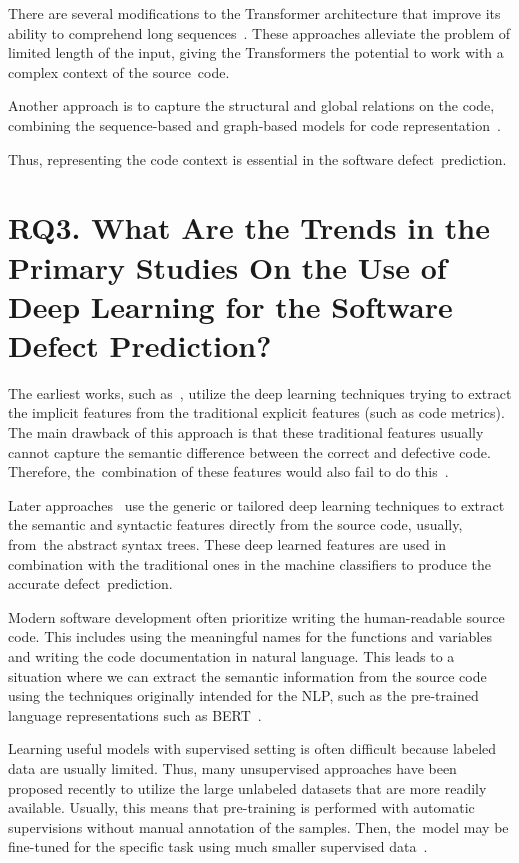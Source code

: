 \documentclass[mathematics,review,accept,moreauthors,pdftex]{Definitions/mdpi}
\begin{document}
\begin{paracol}{2}
There are several modifications to the Transformer architecture that improve its ability to comprehend long sequences~\cite{zaheer2021big,fiok2021text,beltagy2020longformer}. These approaches alleviate the problem of limited length of the input, giving the Transformers the potential to work with a complex context of the source~code. 
 
 Another approach is to capture the structural and global relations on the code, combining the sequence-based and graph-based models for code representation~\cite{hellendoorn2020global,guo2021graphcodebert}. 

Thus, representing the code context is essential in the software defect~prediction. 

\section{RQ3. What Are the Trends in the Primary Studies On the Use of Deep Learning for the Software Defect Prediction?} \label{sec_5}

The earliest works, such as~\cite{YangEtAl2015}, utilize the deep learning techniques trying to extract the implicit features from the traditional explicit features (such as code metrics).
The main drawback of this approach is that these traditional features usually cannot capture the semantic difference between the correct and defective code. Therefore, the~combination of these features would also fail to do this~\cite{LiEtAl2017}.

Later approaches~\cite{DamEtAl2019,HoangEtAl2019} use the generic or tailored deep learning techniques to extract the semantic and syntactic features directly from the source code, usually, from~the abstract syntax trees. These deep learned features are used in combination with the traditional ones in the machine classifiers to produce the accurate defect~prediction.

Modern software development often prioritize writing the human-readable source code. This includes using the  meaningful names for the functions and variables and writing the code documentation in natural language. This leads to a situation where we can extract the semantic information from the source code using the techniques originally intended for the NLP, such as the pre-trained language representations such as BERT~\cite{devlin2019bert}. 

Learning useful models with supervised setting is often difficult because labeled data are usually limited. Thus, many unsupervised approaches have been proposed recently to utilize the large unlabeled datasets that are more readily available. Usually, this means that pre-training is performed with automatic supervisions without manual annotation of the samples. Then, the~model may be fine-tuned for the specific task using much smaller supervised data~\cite{KanadeEtAl2019}.


\end{paracol}
\end{document}
